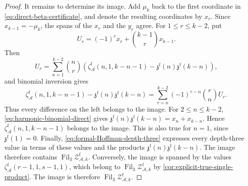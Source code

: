 \documentclass[10pt,a4paper]{amsart}
\DeclareMathOperator{\Fil}{Fil}
\newcommand{\ZAfw}[1]{{\mathcal Z_{\mathcal A,#1}^{\mathrm f}}}
\newcommand{\zaf}[1]{\zeta_{\mathcal A}^{\mathrm f}(#1)}
\newcommand{\zzf}[1]{\mathfrak z^{\mathrm f}(#1)}
\begin{document}
\begin{proof}
It remains to determine its image. Add $\mu_k$ back to the first
coordinate in \eqref{eq:direct-beta-certificate}, and denote the
resulting coordinates by $x_r$. Since $x_{k-1}=-\mu_k$, the spans of
the $x_r$ and the $y_r$ agree. For $1\leq r\leq k-2$, put
\[
 U_r=(-1)^rx_r+\binom{k-1}{r}x_{k-1}.
\]
Then
\[
 U_r=\sum_{n=1}^{k-2}\binom nr
 \left(\zaf{n,1,k-n-1}-\zzf n\zzf{k-n}\right),
\]
and binomial inversion gives
\[
 \zaf{n,1,k-n-1}-\zzf n\zzf{k-n}
 =\sum_{r=n}^{k-2}(-1)^{r-n}\binom rnU_r.
\]
Thus every difference on the left belongs to the image. For
$2\leq n\leq k-2$, \eqref{eq:harmonic-binomial-direct} gives
$\zzf n\zzf{k-n}=x_n+x_{k-n}$. Hence
$\zaf{n,1,k-n-1}$ belongs to the image. This is also true for $n=1$,
since $\zzf 1=0$. Finally,
\eqref{eq:formal-Hoffman-depth-three} expresses every depth-three value
in terms of these values and the products $\zzf n\zzf{k-n}$. The image
therefore contains $\Fil_3\ZAfw{k}$. Conversely, the image is spanned
by the values $\zaf{r-1,1,s-1,1}$, which belong to $\Fil_3\ZAfw{k}$ by
\cref{cor:explicit-true-single-product}. The image is therefore
$\Fil_3\ZAfw{k}$.
\end{proof}
\end{document}
